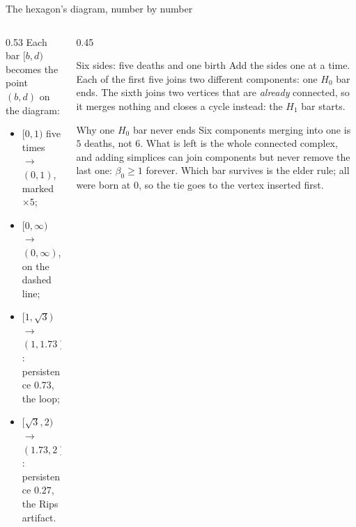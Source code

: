 \documentclass[10pt,aspectratio=169]{beamer}
\newcommand{\HL}[1]{\textcolor{blue!70!black}{#1}}
\begin{document}
\begin{frame}[shrink=8]{The hexagon's diagram, number by number}
\begin{columns}[T,onlytextwidth]
\begin{column}{0.53\textwidth}
                \vspace{0.6em}
                Each bar $[b,d)$ becomes the point $(b,d)$ on the diagram:
                \begin{itemize}
                    \item $[0,1)$ five times $\to$ $(0,1)$, marked $\times5$;
                    \item $[0,\infty)$ $\to$ $(0,\infty)$, on the dashed line;
                    \item $[1,\sqrt3)$ $\to$ $(1,1.73)$: persistence $0.73$, \HL{the loop};
                    \item $[\sqrt3,2)$ $\to$ $(1.73,2)$: persistence $0.27$, the Rips artifact.
                \end{itemize}
            \end{column}
            \begin{column}{0.45\textwidth}
                \small
                \begin{block}{Six sides: five deaths and one birth}
                    Add the sides one at a time. Each of the first five joins two
                    different components: one $H_0$ bar ends. The sixth joins two vertices
                    that are \emph{already} connected, so it merges nothing and closes a
                    cycle instead: the $H_1$ bar starts.
                \end{block}
                \begin{alertblock}{Why one $H_0$ bar never ends}
                    Six components merging into one is $5$ deaths, not $6$. What is left is
                    the whole connected complex, and adding simplices can join components
                    but never remove the last one: $\beta_0\ge1$ forever. Which bar
                    survives is the elder rule; all were born at $0$, so the tie goes to
                    the vertex inserted first.
                \end{alertblock}
            \end{column}
        \end{columns}
    \end{frame}
    \fi
\end{document}
